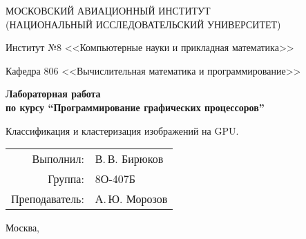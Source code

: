 \begin{titlepage}
\begin{center}
\large
МОСКОВСКИЙ АВИАЦИОННЫЙ ИНСТИТУТ\\ (НАЦИОНАЛЬНЫЙ ИССЛЕДОВАТЕЛЬСКИЙ УНИВЕРСИТЕТ)

\vspace{20pt}

Институт №8 <<Компьютерные науки и прикладная математика>>

Кафедра 806 <<Вычислительная математика и программирование>>
\end{center}

\vspace{60pt}

\begin{center}
\bfseries
\large
Лабораторная работа  \\по курсу \enquote{Программирование графических процессоров}

\vspace{54pt}

Классификация и кластеризация изображений на GPU.
\end{center}

\vfill

\begin{flushright}
\large
\begin{tabular}{rl}
Выполнил: & В.\,В. Бирюков \\
Группа: & 8О-407Б \\
Преподаватель: & А.\,Ю. Морозов \\
\end{tabular}
\end{flushright}

\vspace{92pt}

\begin{center}
\large
Москва, \the\year
\end{center}
\end{titlepage}

\pagebreak
